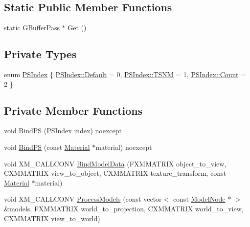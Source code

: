 \subsection*{Static Public Member Functions}
\begin{DoxyCompactItemize}
\item 
static \hyperlink{classmage_1_1_g_buffer_pass}{G\+Buffer\+Pass} $\ast$ \hyperlink{classmage_1_1_g_buffer_pass_ab2a50a7bde900978153badaa49cf047c}{Get} ()
\end{DoxyCompactItemize}
\subsection*{Private Types}
\begin{DoxyCompactItemize}
\item 
enum \hyperlink{classmage_1_1_g_buffer_pass_a1dbae3cb33d9c90ce7eb8c119d576379}{P\+S\+Index} \{ \hyperlink{classmage_1_1_g_buffer_pass_a1dbae3cb33d9c90ce7eb8c119d576379a7a1920d61156abc05a60135aefe8bc67}{P\+S\+Index\+::\+Default} = 0, 
\hyperlink{classmage_1_1_g_buffer_pass_a1dbae3cb33d9c90ce7eb8c119d576379a6e02c9f63944ea221e7d55c11ecae07b}{P\+S\+Index\+::\+T\+S\+NM} = 1, 
\hyperlink{classmage_1_1_g_buffer_pass_a1dbae3cb33d9c90ce7eb8c119d576379ae93f994f01c537c4e2f7d8528c3eb5e9}{P\+S\+Index\+::\+Count} = 2
 \}
\end{DoxyCompactItemize}
\subsection*{Private Member Functions}
\begin{DoxyCompactItemize}
\item 
void \hyperlink{classmage_1_1_g_buffer_pass_a750c27aa6f562b53d62f845ce50e731d}{Bind\+PS} (\hyperlink{classmage_1_1_g_buffer_pass_a1dbae3cb33d9c90ce7eb8c119d576379}{P\+S\+Index} index) noexcept
\item 
void \hyperlink{classmage_1_1_g_buffer_pass_acf03db3d75a3dbacb5c002f6bc72e5ee}{Bind\+PS} (const \hyperlink{classmage_1_1_material}{Material} $\ast$material) noexcept
\item 
void X\+M\+\_\+\+C\+A\+L\+L\+C\+O\+NV \hyperlink{classmage_1_1_g_buffer_pass_a5296050798e8430601e0f42d1f8327db}{Bind\+Model\+Data} (F\+X\+M\+M\+A\+T\+R\+IX object\+\_\+to\+\_\+view, C\+X\+M\+M\+A\+T\+R\+IX view\+\_\+to\+\_\+object, C\+X\+M\+M\+A\+T\+R\+IX texture\+\_\+transform, const \hyperlink{classmage_1_1_material}{Material} $\ast$material)
\item 
void X\+M\+\_\+\+C\+A\+L\+L\+C\+O\+NV \hyperlink{classmage_1_1_g_buffer_pass_abd4c5154aefd3d8e9befdb572b37f40d}{Process\+Models} (const vector$<$ const \hyperlink{classmage_1_1_model_node}{Model\+Node} $\ast$ $>$ \&models, F\+X\+M\+M\+A\+T\+R\+IX world\+\_\+to\+\_\+projection, C\+X\+M\+M\+A\+T\+R\+IX world\+\_\+to\+\_\+view, C\+X\+M\+M\+A\+T\+R\+IX view\+\_\+to\+\_\+world)
\end{DoxyCompactItemize}
